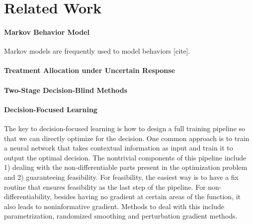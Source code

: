 \section{Related Work}

\paragraph{Markov Behavior Model}
Markov models are frequently used to model behaviors [cite]. 

\paragraph{Treatment Allocation under Uncertain Response} 

\paragraph{Two-Stage Decision-Blind Methods} 

\paragraph{Decision-Focused Learning}
The key to decision-focused learning is how to design a full training pipeline so that we can directly optimize for the decision. One common approach is to train a neural network that takes contextual information as input and train it to output the optimal decision. The nontrivial components of this pipeline include 1) dealing with the non-differentiable parts present in the optimization problem and 2) guaranteeing feasibility. For feasibility, the easiest way is to have a fix routine that ensures feasibility as the last step of the pipeline. For non-differentiability, besides having no gradient at certain areas of the function, it also leads to noninformative gradient. Methods to deal with this include parametrization, randomized smoothing and perturbation gradient methods. 

